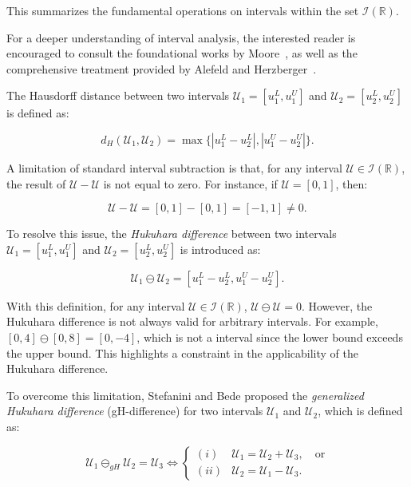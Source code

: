 \documentclass[12pt, reqno]{amsart}
\theoremstyle{definition}
\theoremstyle{remark}
\numberwithin{equation}{section}
\begin{document}
This summarizes the fundamental operations on intervals within the set \( \mathcal{I}(\mathbb{R}) \).



For a deeper understanding of interval analysis, the interested reader is encouraged to consult the foundational works by Moore~\cite{Moore1979}, as well as the comprehensive treatment provided by Alefeld and Herzberger~\cite{AlefeldHerzberger}.




The Hausdorff distance between two intervals \( \mathcal{U }_1= [u_1^L, u_1^U] \) and \(\mathcal{ U}_2 = [u_2^L, u_2^U] \) is defined as:

\[
d_H(\mathcal{U}_1, \mathcal{U}_2) = \max\{|u_1^L - u_2^L|, |u_1^U - u_2^U|\}.
\]

A limitation of  standard interval subtraction is that, for any interval \(\mathcal{ U} \in \mathcal{ I(\mathbb{R})} \), the result of \( \mathcal{U - U }\) is not equal to zero. For instance, if \( \mathcal{U }= [0, 1] \), then:

\[
\mathcal{U - U} = [0, 1] - [0, 1] = [-1, 1] \neq 0.
\]

To resolve this issue, the \textit{Hukuhara difference} between two intervals \( \mathcal{U}_1 = [u_1^L, u_1^U] \) and \(\mathcal{ U }_2= [u_2^L, u_2^U] \) is introduced as:

$$\mathcal{U}_1 \ominus \mathcal{U}_2 = [u_1^L - u_2^L, u_1^U - u_2^U].$$

With this definition, for any interval \( \mathcal{U} \in \mathcal{ I(\mathbb{R})} \), \(\mathcal{ U \ominus U }= 0 \). However, the Hukuhara difference is not always valid for arbitrary intervals. For example, \( [0, 4] \ominus [0, 8] = [0, -4] \), which is not a interval since the lower bound exceeds the upper bound. This highlights a constraint in the applicability of the Hukuhara difference.

To overcome this limitation, Stefanini and Bede \cite{Stefanini2009} proposed the \textit{generalized Hukuhara difference} (gH-difference) for two intervals \( \mathcal{U}_1 \) and \(\mathcal{ U}_2 \), which is defined as:

\[
\mathcal{U}_1 \ominus_{gH} \mathcal{U}_2= \mathcal{U}_3 \iff 
\begin{cases} 
    (i) & \mathcal{U}_1 =\mathcal{ U}_2 + \mathcal{U}_3, \quad \text{or} \\ 
    (ii) & \mathcal{U}_2 = \mathcal{U}_1 - \mathcal{U}_3. 
\end{cases}
\]
\end{document}
